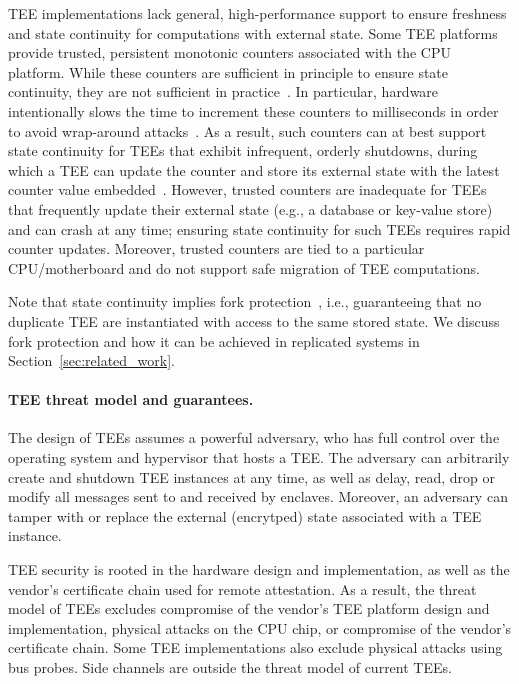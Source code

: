\ac{TEE} implementations lack general, high-performance support to ensure
freshness and state continuity for computations with external state.
Some \ac{TEE} platforms provide trusted, persistent monotonic counters
associated with the CPU platform. While these counters are sufficient
in principle to ensure state continuity, they are not sufficient in
practice~\cite{ariadne}.  In particular, hardware intentionally slows
the time to increment these counters to milliseconds in order to avoid
wrap-around attacks~\cite{ariadne,rote}.  As a result, such counters
can at best support state continuity for \acp{TEE} that exhibit infrequent,
orderly shutdowns, during which a \ac{TEE} can update the counter and store
its external state with the latest counter value
embedded~\cite{ariadne}.  However, trusted counters are inadequate for
\acp{TEE} that frequently update their external state (e.g., a database or
key-value store) and can crash at any time; ensuring state continuity
for such \acp{TEE} requires rapid counter updates.  Moreover, trusted
counters are tied to a particular CPU/motherboard and do not support
safe migration of \ac{TEE} computations.

Note that state continuity implies fork
protection~\cite{fork_lcm}, i.e., guaranteeing that no duplicate
\ac{TEE} are instantiated with access to the same stored state.  We
discuss fork protection and how it can be achieved in replicated
systems in Section~\ref{sec:related_work}.

\paragraph{\ac{TEE} threat model and guarantees.}

The design of \acp{TEE} assumes a powerful adversary, who has full
control over the operating system and hypervisor that hosts a \ac{TEE}.
The adversary can arbitrarily create and shutdown \ac{TEE} instances at
any time, as well as delay, read, drop or modify all messages sent
to and received by enclaves.  Moreover, an adversary can tamper with
or replace the external (encrytped) state associated with a \ac{TEE}
instance.

\ac{TEE} security is rooted in the hardware design and implementation, as
well as the vendor's certificate chain used for remote attestation. As
a result, the threat model of \acp{TEE} excludes compromise of the vendor's
\ac{TEE} platform design and implementation, physical attacks on the CPU
chip, or compromise of the vendor's certificate chain.  Some \ac{TEE}
implementations also exclude physical attacks using bus probes.  Side
channels are outside the threat model of current \acp{TEE}.

